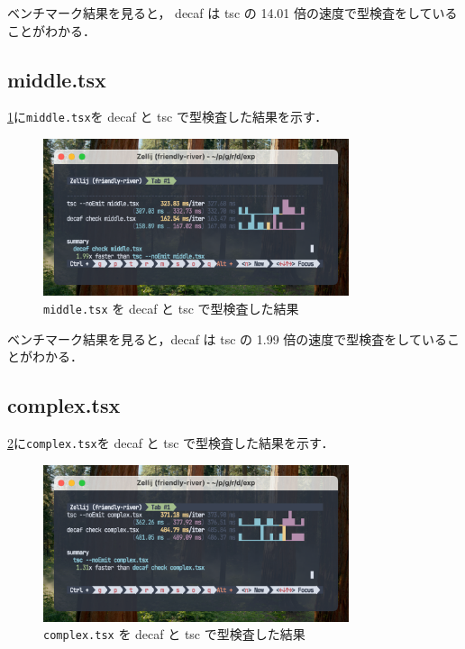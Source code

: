 ベンチマーク結果を見ると， decaf は tsc の 14.01 倍の速度で型検査をしていることがわかる．

\subsection{middle.tsx}

\ref{fig:middle}に\texttt{middle.tsx}を decaf と tsc で型検査した結果を示す．

\begin{figure}[H]
    \centering
    \includegraphics[width=0.8\textwidth]{figures/fig_exp_1_middle_tsx.png}
    \caption{\texttt{middle.tsx} を decaf と tsc で型検査した結果}
    \label{fig:middle}
\end{figure}

ベンチマーク結果を見ると，decaf は tsc の 1.99 倍の速度で型検査をしていることがわかる．

\subsection{complex.tsx}

\ref{fig:complex}に\texttt{complex.tsx}を decaf と tsc で型検査した結果を示す．

\begin{figure}[H]
    \centering
    \includegraphics[width=0.8\textwidth]{figures/fig_exp_1_complex_tsx.png}
    \caption{\texttt{complex.tsx} を decaf と tsc で型検査した結果}
    \label{fig:complex}
\end{figure}

